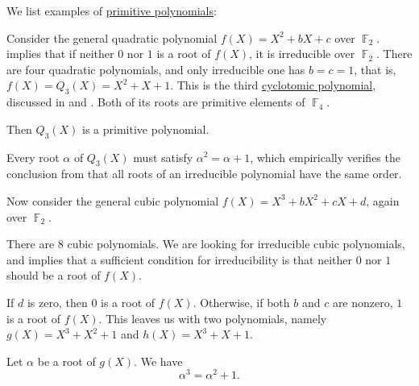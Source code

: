 \begin{example}\label{ex:def:finite_field_primitive_polynomial}
  We list examples of \hyperref[def:finite_field_primitive_polynomial]{primitive polynomials}:
  \begin{thmenum}
     Consider the general quadratic polynomial \( f(X) = X^2 + bX + c \) over \( \BbbF_2 \).  implies that if neither \( 0 \) nor \( 1 \) is a root of \( f(X) \), it is irreducible over \( \BbbF_2 \). There are four quadratic polynomials, and only irreducible one has \( b = c = 1 \), that is, \( f(X) = Q_3(X) = X^2 + X + 1 \). This is the third \hyperref[def:cyclotomic_polynomial]{cyclotomic polynomial}, discussed in  and . Both of its roots are primitive elements of \( \BbbF_4 \).

    Then \( Q_3(X) \) is a primitive polynomial.

    Every root \( \alpha \) of \( Q_3(X) \) must satisfy \( \alpha^2 = \alpha + 1 \), which empirically verifies the conclusion from  that all roots of an irreducible polynomial have the same order.

     Now consider the general cubic polynomial \( f(X) = X^3 + bX^2 + cX + d \), again over \( \BbbF_2 \).

    There are \( 8 \) cubic polynomials. We are looking for irreducible cubic polynomials, and  implies that a sufficient condition for irreducibility is that neither \( 0 \) nor \( 1 \) should be a root of \( f(X) \).

    If \( d \) is zero, then \( 0 \) is a root of \( f(X) \). Otherwise, if both \( b \) and \( c \) are nonzero, \( 1 \) is a root of \( f(X) \). This leaves us with two polynomials, namely \( g(X) = X^3 + X^2 + 1 \) and \( h(X) = X^3 + X + 1 \).

    Let \( \alpha \) be a root of \( g(X) \). We have
    \begin{equation}\label{ex:def:finite_field_primitive_polynomial/f2_cubic/alpha_third}
      \alpha^3 = \alpha^2 + 1.
    \end{equation}


\end{thmenum}
\end{example}
